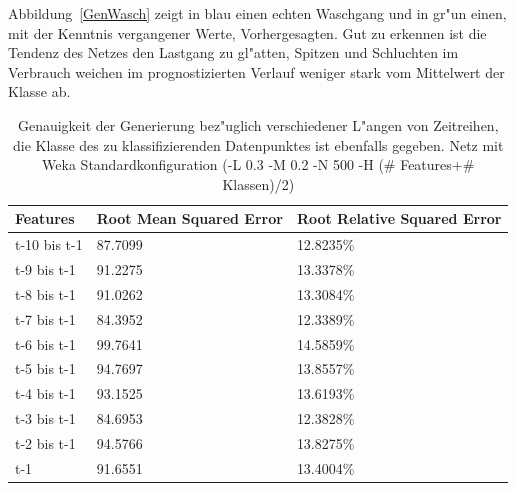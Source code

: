 Abbildung~\ref{GenWasch} zeigt in blau einen echten Waschgang und in gr"un einen, mit der Kenntnis vergangener Werte, Vorhergesagten. Gut zu erkennen ist die Tendenz des Netzes den Lastgang zu gl"atten, Spitzen und Schluchten im Verbrauch weichen im prognostizierten Verlauf weniger stark vom Mittelwert der Klasse ab.

\begin{table}[h]
\begin{tabular}{l|p{4cm}|p{4cm}}
Features & Root Mean Squared Error & Root Relative Squared Error \\
\hline
t-10 bis t-1 & 87.7099 & 12.8235\% \\
t-9 bis t-1 & 91.2275 & 13.3378\% \\
t-8 bis t-1 & 91.0262 & 13.3084\% \\
t-7 bis t-1 & 84.3952 & 12.3389\% \\
t-6 bis t-1 & 99.7641 & 14.5859\% \\
t-5 bis t-1 & 94.7697 & 13.8557\% \\
t-4 bis t-1 & 93.1525 & 13.6193\% \\
t-3 bis t-1 & 84.6953 & 12.3828\% \\
t-2 bis t-1 & 94.5766 & 13.8275\% \\
t-1 & 91.6551 & 13.4004\% 
\end{tabular}
\caption[Generierung mit Zeitreihen Features]{Genauigkeit der Generierung bez"uglich verschiedener L"angen von Zeitreihen, die Klasse des zu klassifizierenden Datenpunktes ist ebenfalls gegeben. Netz mit Weka Standardkonfiguration (-L 0.3 -M 0.2 -N 500 -H (\# Features+\# Klassen)/2)}
\label{GenZeit}
\end{table}

